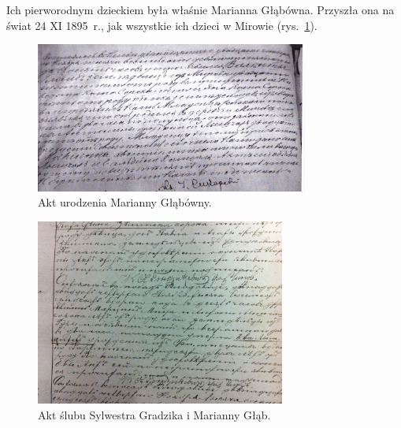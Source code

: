 Ich pierworodnym dzieckiem była właśnie Marianna Głąbówna. Przyszła ona na świat 24 XI 1895~r., jak wszystkie ich dzieci w Mirowie (rys.~\ref{rys:akt_urodzenia_marianny_glab}).

\begin{figure}[!h]
\begin{center}
\includegraphics[width=0.8\textwidth]{zdjecia/akt_urodzenia_marianny_glab.jpg}
\caption{Akt urodzenia Marianny Głąbówny.}
\label{rys:akt_urodzenia_marianny_glab}
\end{center}
\end{figure}

\begin{figure}[!ht]
\begin{center}
\includegraphics[width=0.73\textwidth]{zdjecia/akt_slubu_sylwestra_gradzika_i_marianny_glab.jpg}
\caption{Akt ślubu Sylwestra Gradzika i Marianny Głąb.}
\label{rys:akt_slubu_sylwestra_gradzika_i_marianny_glab}
\end{center}
\end{figure}

